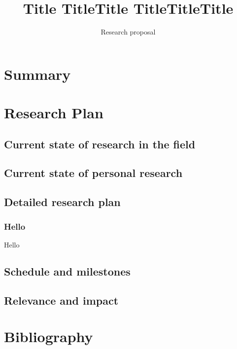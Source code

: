 \documentclass[a4paper,11pt]{article}
\title{Title TitleTitle TitleTitleTitle}
\subtitle{Research proposal}
\begin{document}
\maketitlebox

\section{Summary}

\section{Research Plan}
\subsection{Current state of research in the field}
\subsection{Current state of personal research}
\subsection{Detailed research plan}
\subsubsection{Hello}
Hello

\subsection{Schedule and milestones}
\subsection{Relevance and impact}

\clearpage

\section{Bibliography}

%	
%	
\end{document}
